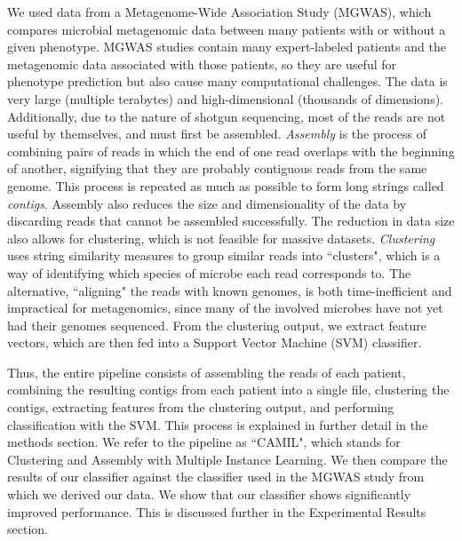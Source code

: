 We used data from a Metagenome-Wide Association Study (MGWAS), which compares microbial metagenomic data between many patients with or without a given phenotype. MGWAS studies contain many expert-labeled patients and the metagenomic data associated with those patients, so they are useful for phenotype prediction but also cause many computational challenges. The data is very large (multiple terabytes) and high-dimensional (thousands of dimensions). Additionally, due to the nature of shotgun sequencing, most of the reads are not useful by themselves, and must first be assembled. \emph{Assembly} is the process of combining pairs of reads in which the end of one read overlaps with the beginning of another, signifying that they are probably contiguous reads from the same genome. This process is repeated as much as possible to form long strings called \emph{contigs}. Assembly also reduces the size and dimensionality of the data by discarding reads that cannot be assembled successfully. The reduction in data size also allows for clustering, which is not feasible for massive datasets. \emph{Clustering} uses string similarity measures to group similar reads into ``clusters", which is a way of identifying which species of microbe each read corresponds to. The alternative, ``aligning" the reads with known genomes, is both time-inefficient and impractical for metagenomics, since many of the involved microbes have not yet had their genomes sequenced. From the clustering output, we extract feature vectors, which are then fed into a Support Vector Machine (SVM) classifier. 

Thus, the entire pipeline consists of assembling the reads of each patient, combining the resulting contigs from each patient into a single file, clustering the contigs, extracting features from the clustering output, and performing classification with the SVM. This process is explained in further detail in the methods section. We refer to the pipeline as ``CAMIL", which stands for Clustering and Assembly with Multiple Instance Learning. We then compare the results of our classifier against the classifier used in the MGWAS study from which we derived our data. We show that our classifier shows significantly improved performance. This is discussed further in the Experimental Results section.

